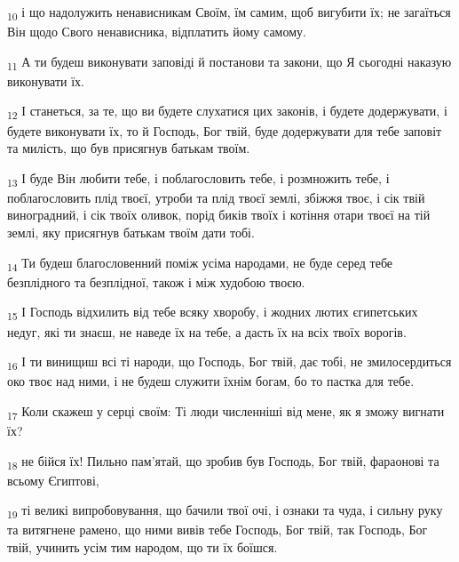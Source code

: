\begin{tcolorbox}
\textsubscript{10} і що надолужить ненависникам Своїм, їм самим, щоб вигубити їх; не загаїться Він щодо Свого ненависника, відплатить йому самому.
\end{tcolorbox}
\begin{tcolorbox}
\textsubscript{11} А ти будеш виконувати заповіді й постанови та закони, що Я сьогодні наказую виконувати їх.
\end{tcolorbox}
\begin{tcolorbox}
\textsubscript{12} І станеться, за те, що ви будете слухатися цих законів, і будете додержувати, і будете виконувати їх, то й Господь, Бог твій, буде додержувати для тебе заповіт та милість, що був присягнув батькам твоїм.
\end{tcolorbox}
\begin{tcolorbox}
\textsubscript{13} І буде Він любити тебе, і поблагословить тебе, і розмножить тебе, і поблагословить плід твоєї, утроби та плід твоєї землі, збіжжя твоє, і сік твій виноградний, і сік твоїх оливок, порід биків твоїх і котіння отари твоєї на тій землі, яку присягнув батькам твоїм дати тобі.
\end{tcolorbox}
\begin{tcolorbox}
\textsubscript{14} Ти будеш благословенний поміж усіма народами, не буде серед тебе безплідного та безплідної, також і між худобою твоєю.
\end{tcolorbox}
\begin{tcolorbox}
\textsubscript{15} І Господь відхилить від тебе всяку хворобу, і жодних лютих єгипетських недуг, які ти знаєш, не наведе їх на тебе, а дасть їх на всіх твоїх ворогів.
\end{tcolorbox}
\begin{tcolorbox}
\textsubscript{16} І ти винищиш всі ті народи, що Господь, Бог твій, дає тобі, не змилосердиться око твоє над ними, і не будеш служити їхнім богам, бо то пастка для тебе.
\end{tcolorbox}
\begin{tcolorbox}
\textsubscript{17} Коли скажеш у серці своїм: Ті люди численніші від мене, як я зможу вигнати їх?
\end{tcolorbox}
\begin{tcolorbox}
\textsubscript{18} не бійся їх! Пильно пам'ятай, що зробив був Господь, Бог твій, фараонові та всьому Єгиптові,
\end{tcolorbox}
\begin{tcolorbox}
\textsubscript{19} ті великі випробовування, що бачили твої очі, і ознаки та чуда, і сильну руку та витягнене рамено, що ними вивів тебе Господь, Бог твій, так Господь, Бог твій, учинить усім тим народом, що ти їх боїшся.
\end{tcolorbox}
